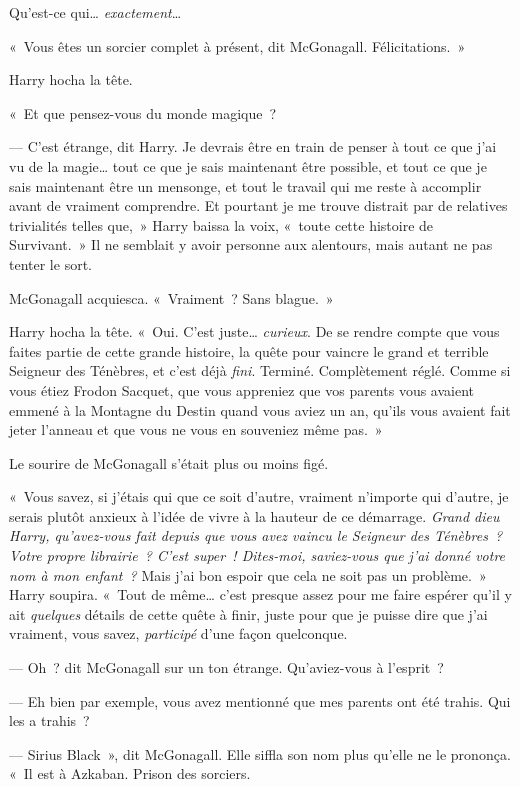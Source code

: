 Qu'est-ce qui… \emph{exactement}…

«~Vous êtes un sorcier complet à présent, dit McGonagall. Félicitations.~»

Harry hocha la tête.

«~Et que pensez-vous du monde magique~?

--- C'est étrange, dit Harry. Je devrais être en train de penser à tout ce que j'ai vu de la magie… tout ce que je sais maintenant être possible, et tout ce que je sais maintenant être un mensonge, et tout le travail qui me reste à accomplir avant de vraiment comprendre. Et pourtant je me trouve distrait par de relatives trivialités telles que,~» Harry baissa la voix, «~toute cette histoire de Survivant.~» Il ne semblait y avoir personne aux alentours, mais autant ne pas tenter le sort.

McGonagall acquiesca. «~Vraiment~? Sans blague.~»

Harry hocha la tête. «~Oui. C'est juste… \emph{curieux}. De se rendre compte que vous faites partie de cette grande histoire, la quête pour vaincre le grand et terrible Seigneur des Ténèbres, et c'est déjà \emph{fini}. Terminé. Complètement réglé. Comme si vous étiez Frodon Sacquet, que vous appreniez que vos parents vous avaient emmené à la Montagne du Destin quand vous aviez un an, qu'ils vous avaient fait jeter l'anneau et que vous ne vous en souveniez même pas.~»

Le sourire de McGonagall s'était plus ou moins figé.

«~Vous savez, si j'étais qui que ce soit d'autre, vraiment n'importe qui d'autre, je serais plutôt anxieux à l'idée de vivre à la hauteur de ce démarrage. \emph{Grand dieu Harry, qu'avez-vous fait depuis que vous avez vaincu le Seigneur des Ténèbres~? Votre propre librairie~? C'est super~! Dites-moi, saviez-vous que j'ai donné votre nom à mon enfant~?} Mais j'ai bon espoir que cela ne soit pas un problème.~» Harry soupira. «~Tout de même… c'est presque assez pour me faire espérer qu'il y ait \emph{quelques} détails de cette quête à finir, juste pour que je puisse dire que j'ai vraiment, vous savez, \emph{participé} d'une façon quelconque.

--- Oh~? dit McGonagall sur un ton étrange. Qu'aviez-vous à l'esprit~?

--- Eh bien par exemple, vous avez mentionné que mes parents ont été trahis. Qui les a trahis~?

--- Sirius Black~», dit McGonagall. Elle siffla son nom plus qu'elle ne le prononça. «~Il est à Azkaban. Prison des sorciers.

